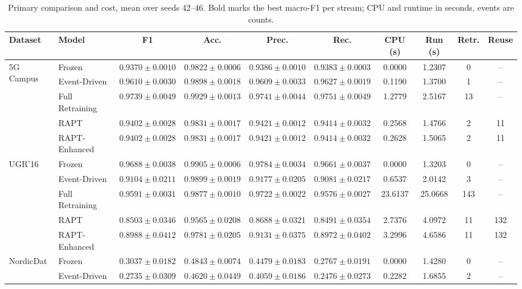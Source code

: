 \documentclass[conference]{IEEEtran}
\begin{document}
\begin{table}[t]
\caption{Primary comparison and cost, mean over seeds 42--46. Bold marks the
best macro-F1 per stream; CPU and runtime in seconds, events are counts.}
\label{tab:primary}
\centering
\scriptsize
\begin{tabular}{@{}llcccccccc@{}}
\toprule
\textbf{Dataset} & \textbf{Model} & \textbf{F1} & \textbf{Acc.} & \textbf{Prec.} & \textbf{Rec.} & \textbf{CPU (s)} & \textbf{Run (s)} & \textbf{Retr.} & \textbf{Reuse} \\
\midrule
\multirow{5}{*}{5G Campus}
 & Frozen & $0.9370 \pm 0.0010$ & $0.9822 \pm 0.0006$ & $0.9386 \pm 0.0010$ & $0.9383 \pm 0.0003$ & 0.0000 & 1.2307 & 0 & -- \\
 & Event-Driven & $0.9610 \pm 0.0030$ & $0.9898 \pm 0.0018$ & $0.9609 \pm 0.0033$ & $0.9627 \pm 0.0019$ & 0.1190 & 1.3700 & 1 & -- \\
 & Full Retraining & $\mathbf{0.9739 \pm 0.0049}$ & $0.9929 \pm 0.0013$ & $0.9741 \pm 0.0044$ & $0.9751 \pm 0.0049$ & 1.2779 & 2.5167 & 13 & -- \\
 & RAPT & $0.9402 \pm 0.0028$ & $0.9831 \pm 0.0017$ & $0.9421 \pm 0.0012$ & $0.9414 \pm 0.0032$ & 0.2568 & 1.4766 & 2 & 11 \\
 & RAPT-Enhanced & $0.9402 \pm 0.0028$ & $0.9831 \pm 0.0017$ & $0.9421 \pm 0.0012$ & $0.9414 \pm 0.0032$ & 0.2628 & 1.5065 & 2 & 11 \\
\midrule
\multirow{5}{*}{UGR'16}
 & Frozen & $\mathbf{0.9688 \pm 0.0038}$ & $0.9905 \pm 0.0006$ & $0.9784 \pm 0.0034$ & $0.9661 \pm 0.0037$ & 0.0000 & 1.3203 & 0 & -- \\
 & Event-Driven & $0.9104 \pm 0.0211$ & $0.9899 \pm 0.0019$ & $0.9177 \pm 0.0205$ & $0.9081 \pm 0.0217$ & 0.6537 & 2.0142 & 3 & -- \\
 & Full Retraining & $0.9591 \pm 0.0031$ & $0.9877 \pm 0.0010$ & $0.9722 \pm 0.0022$ & $0.9576 \pm 0.0027$ & 23.6137 & 25.0668 & 143 & -- \\
 & RAPT & $0.8503 \pm 0.0346$ & $0.9565 \pm 0.0208$ & $0.8688 \pm 0.0321$ & $0.8491 \pm 0.0354$ & 2.7376 & 4.0972 & 11 & 132 \\
 & RAPT-Enhanced & $0.8988 \pm 0.0412$ & $0.9781 \pm 0.0205$ & $0.9131 \pm 0.0375$ & $0.8972 \pm 0.0402$ & 3.2996 & 4.6586 & 11 & 132 \\
\midrule
\multirow{5}{*}{NordicDat}
 & Frozen & $0.3037 \pm 0.0182$ & $0.4843 \pm 0.0074$ & $0.4479 \pm 0.0183$ & $0.2767 \pm 0.0191$ & 0.0000 & 1.4280 & 0 & -- \\
 & Event-Driven & $0.2735 \pm 0.0309$ & $0.4620 \pm 0.0449$ & $0.4059 \pm 0.0186$ & $0.2476 \pm 0.0273$ & 0.2282 & 1.6855 & 2 & -- \\

\end{tabular}
\end{table}
\end{document}
